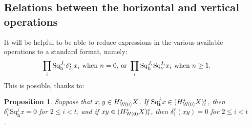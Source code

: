 \documentclass[11pt]{amsart} \renewcommand{\baselinestretch}{1.2}
\theoremstyle{plain}
\newtheorem{prop}[thm]{Proposition}
\theoremstyle{definition}
\newcommand{\calw}{\mathcal{W}}
\newcommand{\uver}{^\mathrm{v}}
\newcommand{\dver}{_\mathrm{v}}
\newcommand{\dhor}{_\mathrm{h}}
\newcommand{\Sqh}{\mathrm{Sq}\dhor}
\newcommand{\Sqv}{\mathrm{Sq}\dver}
\newcommand{\deltav}{\delta\uver}
\begin{document}
\begin{Cohomology Operations for W and U}
\subsection{Relations between the horizontal and vertical operations}
\label{Relations between the horizontal and vertical operations}
It will be helpful to be able to reduce %
expressions in the various available operations to a standard format, namely:
\[\prod_i \Sqh^{J_{i}}\deltav_{I_{i}}x_i\textup{ when $n=0$, or }\prod_i \Sqh^{J_{i}}\Sqv^{I_{i}}x_i\textup{ when $n\geq1$}.\]
This is possible, thanks to:
\begin{prop}
\label{rearrange horiz and vert ops}
Suppose that $x,y\in H^*_{\smash{\calw(0)}}X$. If $\Sqh^jx\in (H^*_{\smash{\calw(0)}}X)^{s}_{t}$, then $\deltav_i\Sqh^{j}x=0$ for  $2\leq i<t$, and if $xy\in (H^*_{\smash{\calw(0)}}X)^{s}_{t}$, then $\deltav_i(xy)=0$ for  $2\leq i<t$.


\end{prop}
\end{Cohomology Operations for W and U}
\end{document}
